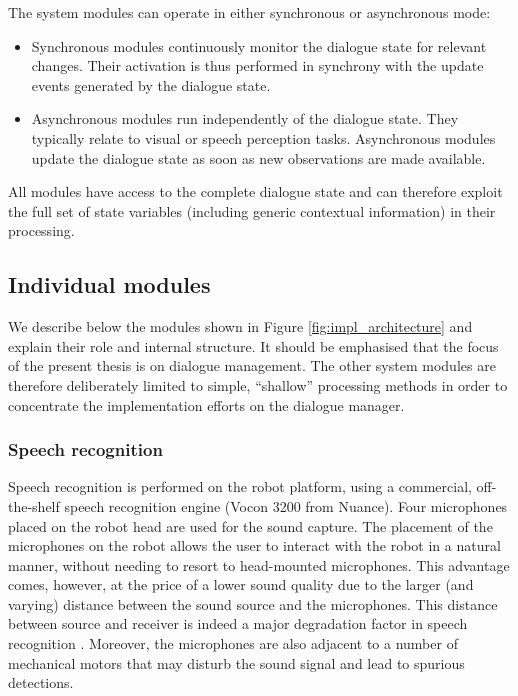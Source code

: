 The system modules can operate in either synchronous or asynchronous mode: \begin{itemize}
\item Synchronous modules continuously monitor the dialogue state for relevant changes.  Their activation is thus performed in synchrony with the update events generated by the dialogue state.
\item Asynchronous modules run independently of the dialogue state.  They typically relate to visual or speech perception tasks. Asynchronous modules update the dialogue state as soon as new observations are made available. 

\end{itemize}

All modules have access to the complete dialogue state and can therefore exploit the full set of state variables (including generic contextual information) in their processing. 

\subsection{Individual modules}

We describe below the modules shown in Figure \ref{fig:impl_architecture} and explain their role and internal structure. It should be emphasised that the focus of the present thesis is on dialogue management.  The other system modules are therefore deliberately limited to simple, ``shallow'' processing methods in order to concentrate the implementation efforts on the dialogue manager. %

\subsubsection*{Speech recognition}

Speech recognition is performed on the robot platform, using a commercial, off-the-shelf speech recognition engine (Vocon 3200 from Nuance).  Four microphones placed on the robot head are used for the sound capture.  The placement of the microphones on the robot allows the user to interact with the robot in a natural manner, without needing to resort to head-mounted microphones. This advantage comes, however, at the price of a lower sound quality due to the larger (and varying) distance between the sound source and the microphones.   This distance between source and receiver is indeed a major degradation factor in speech recognition \citep{wolfel2009distant}. Moreover, the microphones are also adjacent to a number of mechanical motors that may disturb the sound signal and lead to spurious detections.

